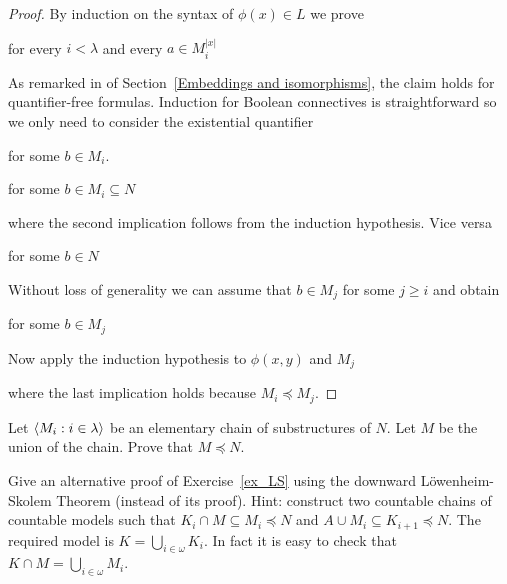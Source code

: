 \documentclass[creche.tex]{subfiles}
\begin{document}
\begin{proof}
By induction on the syntax of $\phi(x)\in L$ we prove

 for every $i<\lambda$ and every $a\in M_i^{|x|}$

As remarked in  of Section~\ref{Embeddings and isomorphisms}, the claim holds for quantifier-free formulas.
Induction for Boolean connectives is straightforward so we only need to consider the existential quantifier

 for some $b\in M_i$.

 for some $b\in M_i\subseteq N$

where the second implication follows from the induction hypothesis.
Vice versa

 for some $b\in N$

Without loss of generality we can assume that $b\in M_j$ for some $j\ge i$ and obtain

 for some $b\in M_j$

Now apply the induction hypothesis to $\phi(x,y)$ and $M_j$



where the last implication holds because $M_i\preceq M_j$.
\end{proof}

\begin{exercise}
Let $\langle M_i:i\in\lambda\rangle$ be an elementary chain of substructures of $N$.
Let $M$ be the union of the chain.
Prove that $M\preceq N$.\QED
\end{exercise}


\begin{exercise}
Give an alternative proof of Exercise~\ref{ex_LS} using the downward L\"owenheim-Skolem Theorem (instead of its proof).
Hint: construct two countable chains of countable models such that $K_i\cap M\subseteq M_i\preceq N$ and $A\cup M_i\subseteq K_{i+1}\preceq N$.
The required model is $K=\bigcup_{i\in\omega}K_i$.
In fact it is easy to check that $K\cap M=\bigcup_{i\in\omega}M_i$.\QED
\end{exercise}
\end{document}
